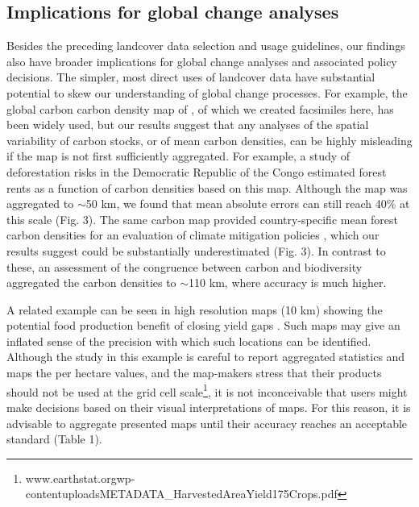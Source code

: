 \documentclass[a4paper]{article}
\begin{document}
\subsection*{Implications for global change analyses}
Besides the preceding landcover data selection and usage guidelines, our findings also have broader implications for global change analyses and associated policy decisions. The simpler, most direct uses of landcover data have substantial potential to skew our understanding of global change processes. For example, the global carbon carbon density map of \citep{ruesch_new_2008}, of which we created facsimiles here, has been widely used, but our results suggest that any analyses of the spatial variability of carbon stocks, or of mean carbon densities, can be highly misleading if the map is not first sufficiently aggregated. For example, a study of deforestation risks in the Democratic Republic of the Congo estimated forest rents as a function of carbon densities based on this map. Although the map was aggregated to $\sim$50 km, we found that mean absolute errors can still reach 40\% at this scale (Fig. 3). The same carbon map provided country-specific mean forest carbon densities for an evaluation of climate mitigation policies \citep{cattaneo_international_2010}, which our results suggest could be substantially underestimated (Fig. 3). In contrast to these, an assessment of the congruence between carbon and biodiversity \citep{strassburg_global_2010} aggregated the carbon densities to $\sim$110 km, where accuracy is much higher. 

A related example can be seen in high resolution maps (10 km) showing the potential food production benefit of closing yield gaps \citep[e.g. Figure 3 in][]{foley_solutions_2011}. Such maps may give an inflated sense of the precision with which such locations can be identified. Although the study in this example is careful to report aggregated statistics and maps the per hectare values, and the map-makers stress that their products should not be used at the grid cell scale\footnote{www.earthstat.org\/wp-content\/uploads\/METADATA\_HarvestedAreaYield175Crops.pdf}, it is not inconceivable that users might make decisions based on their visual interpretations of maps. For this reason, it is advisable to aggregate presented maps until their accuracy reaches an acceptable standard (Table 1). 
\end{document}
